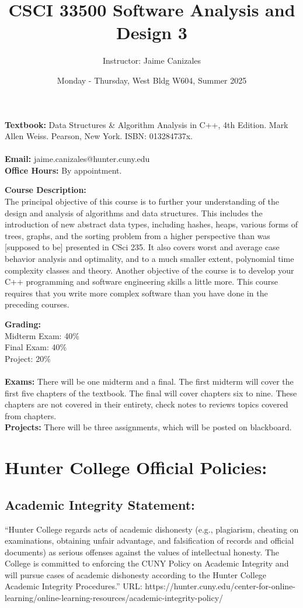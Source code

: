 \documentclass[a4paper]{article}
\title{CSCI 33500 Software Analysis and Design 3}
\author{Instructor: Jaime Canizales}
\date{Monday - Thursday, West Bldg W604, Summer 2025}
\begin{document}
\maketitle

\textbf{Textbook:} Data Structures \& Algorithm Analysis in C++, 4th Edition. Mark Allen Weiss. Pearson, New
York. ISBN: 013284737x.
\\\\
\textbf{Email:} jaime.canizales@hunter.cuny.edu \\
\textbf{Office Hours:} By appointment.

\textbf{Course Description:}\\ The principal objective of this course is to further your understanding of the design and analysis of
algorithms and data structures. This includes the introduction of new abstract data types, including
hashes, heaps, various forms of trees, graphs, and the sorting problem from a higher perspective than
was [supposed to be] presented in CSci 235. It also covers worst and average case behavior analysis
and optimality, and to a much smaller extent, polynomial time complexity classes and theory. Another
objective of the course is to develop your C++ programming and software engineering skills a little more.
This course requires that you write more complex software than you have done in the preceding courses.

\textbf{Grading: } \\
Midterm Exam: \hspace{1mm} 40\% \\
Final Exam: \hspace{6mm} 40\% \\
Project: \hspace{13mm} 20\%
\\\\
\textbf{Exams:} There will be one midterm and a final. The first midterm will cover the first five chapters of
the textbook. The final will cover chapters six to nine. These chapters are not covered in their entirety,
check notes to reviews topics covered from chapters.\\

\textbf{Projects: } There will be three assignments, which will be posted on blackboard.

\section*{Hunter College Official Policies:}
\subsection{Academic Integrity Statement:} 
“Hunter College regards acts of academic dishonesty (e.g., plagiarism, cheating
on examinations, obtaining unfair advantage, and falsification of records and 
official documents) as serious offenses against the values of intellectual 
honesty. The College is committed to enforcing the CUNY Policy on Academic 
Integrity and will pursue cases of academic dishonesty according to the Hunter
College Academic Integrity Procedures.”  
URL: https://hunter.cuny.edu/center-for-online-learning/online-learning-resources/academic-integrity-policy/
\end{document}
